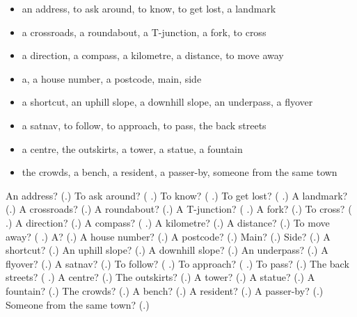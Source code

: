 \begin{itemize}
\raggedright
  \item an address, to ask around, to know, to get lost, a landmark
  \item a crossroads, a roundabout, a T-junction, a fork, to cross
  \item a direction, a compass, a kilometre, a distance, to move away
  \item a, a house number, a postcode, main, side
  \item a shortcut, an uphill slope, a downhill slope, an underpass, a flyover
  \item a satnav, to follow, to approach, to pass, the back streets
  \item a centre, the outskirts, a tower, a statue, a fountain
  \item the crowds, a bench, a resident, a passer-by, someone from the same town
\end{itemize}

\begin{tcolorbox}[breakable,colback=teal!4,colframe=teal!35!black,title={Before you move on}]
An address? (\textbf{}.) To ask around? (\textbf{   }.) To know? (\textbf{ }.) To get lost? (\textbf{ }.) A landmark? (\textbf{}.) A crossroads? (\textbf{}.) A roundabout? (\textbf{}.) A T-junction? (\textbf{ }.) A fork? (\textbf{}.) To cross? (\textbf{ }.) A direction? (\textbf{}.) A compass? (\textbf{ }.) A kilometre? (\textbf{}.) A distance? (\textbf{}.) To move away? (\textbf{ }.) A? (\textbf{}.) A house number? (\textbf{}.) A postcode? (\textbf{}.) Main? (\textbf{}.) Side? (\textbf{}.) A shortcut? (\textbf{}.) An uphill slope? (\textbf{}.) A downhill slope? (\textbf{}.) An underpass? (\textbf{}.) A flyover? (\textbf{}.) A satnav? (\textbf{}.) To follow? (\textbf{ }.) To approach? (\textbf{ }.) To pass? (\textbf{}.) The back streets? (\textbf{  }.) A centre? (\textbf{}.) The outskirts? (\textbf{}.) A tower? (\textbf{}.) A statue? (\textbf{}.) A fountain? (\textbf{}.) The crowds? (\textbf{}.) A bench? (\textbf{}.) A resident? (\textbf{}.) A passer-by? (\textbf{}.) Someone from the same town? (\textbf{}.)
\end{tcolorbox}
